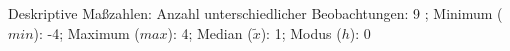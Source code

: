 				\label{tableValues:cski02c}
				\vspace*{-\baselineskip}
                    \begin{noten}
                	    \note{} Deskriptive Maßzahlen:
                	    Anzahl unterschiedlicher Beobachtungen: 9%
                	    ; 
                	      Minimum ($min$): -4; 
                	      Maximum ($max$): 4; 
                	      Median ($\tilde{x}$): 1; 
                	      Modus ($h$): 0
                     \end{noten}


